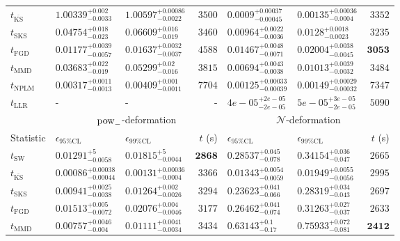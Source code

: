 \begin{tabular}{l|llr|llr}
	$t_{\overline{\mathrm{KS}}}$ & $1.00339_{-0.0033}^{+0.002}$ & $1.00597_{-0.0022}^{+0.00086}$ & $3500$ & ${\mathbf{0.0009_{-0.00045}^{+0.00037}}}$ & ${\mathbf{0.00135_{-0.0004}^{+0.00036}}}$ & $3352$ \\
	$t_{\mathrm{SKS}}$ & $0.04754_{-0.023}^{+0.018}$ & $0.06609_{-0.019}^{+0.016}$ & $3460$ & $0.00964_{-0.0036}^{+0.0022}$ & $0.0128_{-0.0023}^{+0.0018}$ & $3235$ \\
	$t_{\mathrm{FGD}}$ & ${\mathbf{0.01177_{-0.0057}^{+0.0039}}}$ & ${\mathbf{0.01637_{-0.0037}^{+0.0032}}}$ & $4588$ & $0.01467_{-0.0071}^{+0.0048}$ & $0.02004_{-0.0045}^{+0.0038}$ & ${\mathbf{3053}}$ \\
	$t_{\mathrm{MMD}}$ & $0.03683_{-0.019}^{+0.022}$ & $0.05299_{-0.016}^{+0.02}$ & $3815$ & $0.00694_{-0.0038}^{+0.0043}$ & $0.01013_{-0.0032}^{+0.0039}$ & $3484$ \\
\rowcolor{red!35}	$t_{\mathrm{NPLM}}$ & $0.00317_{-0.0013}^{+0.0011}$ & $0.00409_{-0.0011}^{+0.001}$ & $7704$ & $0.00125_{-0.00039}^{+0.00033}$ & $0.00149_{-0.00032}^{+0.00029}$ & $7347$ \\
	$t_{\mathrm{LLR}}$ & - & - & - & $4e-05_{-2e-05}^{+2e-05}$ & $5e-05_{-2e-05}^{+3e-05}$ & $5090$ \\
	\toprule
	\multicolumn{1}{c}{} & \multicolumn{3}{c}{$\rm{pow}_{-}$-deformation} & \multicolumn{3}{c}{$\mathcal{N}$-deformation} \\
	Statistic & $\epsilon_{95\%\mathrm{CL}}$ & $\epsilon_{99\%\mathrm{CL}}$ & $t$ (s) & $\epsilon_{95\%\mathrm{CL}}$ & $\epsilon_{99\%\mathrm{CL}}$ & $t$ (s) \\
	\midrule
	$t_{\mathrm{SW}}$ & $0.01291_{-0.0058}^{+5}$ & $0.01815_{-0.0044}^{+5}$ & ${\mathbf{2868}}$ & $0.28537_{-0.078}^{+0.045}$ & $0.34154_{-0.047}^{+0.036}$ & $2665$ \\
	$t_{\overline{\mathrm{KS}}}$ & ${\mathbf{0.00086_{-0.00044}^{+0.00038}}}$ & ${\mathbf{0.00131_{-0.0004}^{+0.00036}}}$ & $3366$ & ${\mathbf{0.01343_{-0.0059}^{+0.0054}}}$ & ${\mathbf{0.01949_{-0.0056}^{+0.0055}}}$ & $2995$ \\
	$t_{\mathrm{SKS}}$ & $0.00941_{-0.0038}^{+0.0025}$ & $0.01264_{-0.0026}^{+0.002}$ & $3294$ & $0.23623_{-0.066}^{+0.041}$ & $0.28319_{-0.043}^{+0.034}$ & $2697$ \\
	$t_{\mathrm{FGD}}$ & $0.01513_{-0.0072}^{+0.005}$ & $0.02076_{-0.0046}^{+0.004}$ & $3177$ & $0.26462_{-0.074}^{+0.041}$ & $0.31263_{-0.037}^{+0.027}$ & $2633$ \\
	$t_{\mathrm{MMD}}$ & $0.00757_{-0.004}^{+0.0046}$ & $0.01111_{-0.0034}^{+0.0041}$ & $3434$ & $0.63143_{-0.17}^{+0.1}$ & $0.75933_{-0.081}^{+0.072}$ & ${\mathbf{2412}}$ \\

\end{tabular}
